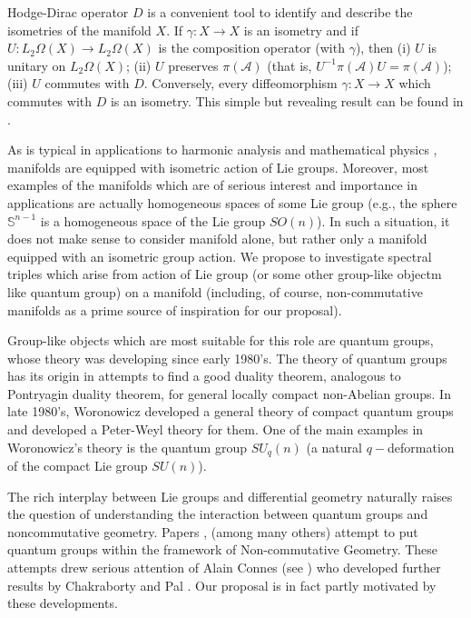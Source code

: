 \documentclass{article}
\begin{document}
Hodge-Dirac operator $D$ is a convenient tool to identify and describe the isometries of the manifold $X.$ If $\gamma:X\to X$ is an isometry and if $U:L_2\Omega(X)\to L_2\Omega(X)$ is the composition operator (with $\gamma$), then (i) $U$ is unitary on $L_2\Omega(X)$; (ii) $U$ preserves $\pi(\mathcal{A})$ (that is, $U^{-1}\pi(\mathcal{A})U=\pi(\mathcal{A})$); (iii) $U$ commutes with $D.$ Conversely, every diffeomorphism $\gamma:X\to X$ which commutes with $D$ is an isometry. This simple but revealing result can be found in \cite{helgason}.

As is typical in applications to harmonic analysis \cite{helgason} and mathematical physics \cite{c2dft}, manifolds are equipped with isometric action of Lie groups. Moreover, most examples of the manifolds which are of serious interest and importance in applications are actually homogeneous spaces of some Lie group (e.g., the sphere $\mathbb{S}^{n-1}$ is a homogeneous space of the Lie group $SO(n)$). In such a situation, it does not make sense to consider manifold alone, but rather only a manifold equipped with an isometric group action. We propose to investigate spectral triples which arise from action of Lie group (or some other group-like objectm like quantum group) on a manifold (including, of course, non-commutative manifolds as a prime source of inspiration for our proposal).

Group-like objects which are most suitable for this role are quantum groups, whose theory was developing since early 1980's. The theory of quantum groups has its origin in attempts to find a good duality theorem, analogous to Pontryagin duality theorem, for general locally compact non-Abelian groups. In late 1980's, Woronowicz developed a general theory of compact quantum groups and developed a Peter-Weyl theory for them. One of the main examples in Woronowicz's theory is the quantum group $SU_q(n)$ (a natural $q-$deformation of the compact Lie group $SU(n)$). 

The rich interplay between Lie groups and differential geometry naturally raises the question of understanding the interaction between quantum groups and noncommutative geometry. Papers \cite{ChakrabortyPal}, \cite{NeshTus} (among many others) attempt to put quantum groups within the framework of Non-commutative Geometry. These attempts drew serious attention of Alain Connes (see \cite{Connes-suq2}) who developed further results by Chakraborty and Pal \cite{ChakrabortyPal}. Our proposal is in fact partly motivated by these developments.
\end{document}
